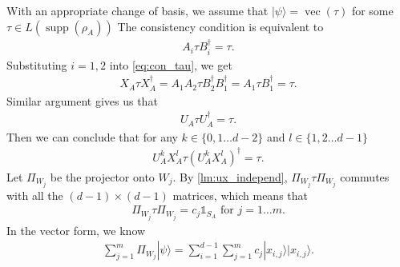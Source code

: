 \documentclass[11pt,letterpaper]{article}
\newcommand{\ket}[1]{|#1\rangle}
\newcommand{\ketbra}[2]{|#1\rangle\langle#2|}
\newcommand{\x}{\otimes}
\DeclareMathOperator{\vc}{vec}
\DeclareMathOperator{\spn}{span}
\DeclareMathOperator{\supp}{supp}
\newcommand{\1}{\mathbb{1}}
\theoremstyle{definition}
\begin{document}


With an appropriate change of basis, we 
assume that $\ket{\psi} = \vc(\tau)$ for some $\tau \in L(\supp(\rho_A))$
The consistency condition is equivalent to
\begin{align}
\label{eq:con_tau}
	A_i \tau B_i^\dagger = \tau.
\end{align}
Substituting $i=1,2$ into \cref{eq:con_tau}, we get 
\begin{align}
	X_A \tau X_A^\dagger = A_1A_2\tau B_2^\dagger B_1^\dagger = A_1\tau B_1^\dagger = \tau.
\end{align}
Similar argument gives us that 
\begin{align}
	U_A \tau U_A^\dagger = \tau.
\end{align}
Then we can conclude that for any $k \in \{0,1 \dots d-2\}$ and $l \in \{1,2\dots d-1\}$
\begin{align}
	U_A^kX_A^l \tau (U_A^kX_A^l)^\dagger = \tau.
\end{align}
Let $\Pi_{W_j}$ be the projector onto $W_j$. 
By \cref{lm:ux_independ}, $\Pi_{W_j} \tau \Pi_{W_j}$ commutes with all the $(d-1) \times (d-1)$ matrices, which means that 
\begin{align}
	\label{eq:d-1}
	\Pi_{W_j} \tau \Pi_{W_j}  = c_j \1_{S_A} \text{ for } j = 1\dots m.
\end{align}
In the vector form, we know
\begin{align}
	\sum_{j =1}^m \Pi_{W_j} \ket{\psi} =\sum_{i=1}^{d-1} \sum_{j=1}^m c_j \ket{x_{i,j}}\ket{x_{i,j}}. 
\end{align}
\end{document}
